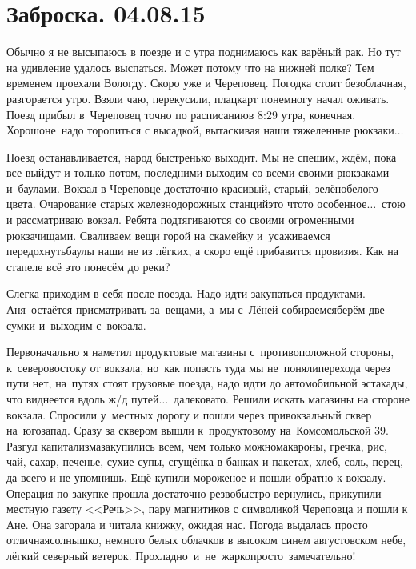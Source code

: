 \chapter{Заброска. 04.08.15}

Обычно я не высыпаюсь в поезде и с утра поднимаюсь как варёный рак. Но тут на удивление удалось выспаться. Может потому что на нижней полке? Тем временем проехали Вологду. Скоро уже и Череповец. Погодка стоит безоблачная, разгорается утро. Взяли чаю, перекусили, плацкарт понемногу начал оживать. Поезд прибыл в~Череповец точно по расписанию\mdash в 8:29 утра, конечная. Хорошо\mdash не~надо торопиться с высадкой, вытаскивая наши тяжеленные рюкзаки$\ldots$
 
Поезд останавливается, народ быстренько выходит. Мы не спешим, ждём, пока все выйдут и только потом, последними выходим со всеми своими рюкзаками и~баулами. Вокзал в Череповце достаточно красивый, старый, зелёно\sdash белого цвета. Очарование старых железнодорожных станций\mdash это что\sdash то особенное$\ldots$~стою и рассматриваю вокзал. Ребята подтягиваются со своими огроменными рюкзачищами. Сваливаем вещи горой на скамейку и~усаживаемся передохнуть\mdash баулы наши не из лёгких, а скоро ещё прибавится провизия. Как на стапеле всё это понесём до реки? 

Слегка приходим в себя после поезда. Надо идти закупаться продуктами. Аня~остаётся присматривать за~вещами, а~мы с~Лёней собираемся\mdash берём две сумки и~выходим с~вокзала. 

Первоначально я наметил продуктовые магазины с~противоположной стороны, к~северо\sdash востоку от вокзала, но~как попасть туда мы не~поняли\mdash перехода через пути нет, на~путях стоят грузовые поезда, надо идти до автомобильной эстакады, что виднеется вдоль ж/д путей$\ldots$~далековато. Решили искать магазины на стороне вокзала. Спросили у~местных дорогу и пошли через привокзальный сквер на~юго\sdash запад. Сразу за сквером вышли к~продуктовому на~Комсомольской 39. Разгул капитализма\mdash закупились всем, чем только можно\mdash макароны, гречка, рис, чай, сахар, печенье, сухие супы, сгущёнка в банках и пакетах, хлеб, соль, перец, да всего и не упомнишь. Ещё купили мороженое и пошли обратно к вокзалу. Операция по закупке прошла достаточно резво\mdash быстро вернулись, прикупили местную газету <<Речь>>, пару магнитиков с символикой Череповца и пошли к Ане. Она загорала и читала книжку, ожидая нас. Погода выдалась просто отличная\mdash солнышко, немного белых облачков в высоком синем августовском небе, лёгкий северный ветерок. Прохладно~и~не~жарко\mdash просто~замечательно! 

